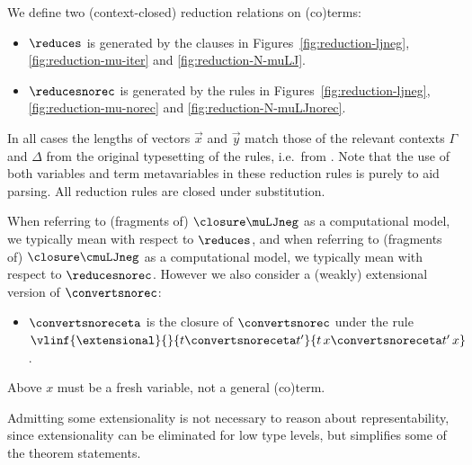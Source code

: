 \begin{definition}
    [Theories]
    We define two (context-closed) reduction relations on (co)terms: 
    \begin{itemize}
        \item $\reduces$ is generated by the clauses in Figures~\ref{fig:reduction-ljneg}, \ref{fig:reduction-mu-iter} and \ref{fig:reduction-N-muLJ}.
        \item $\reducesnorec$ is generated by the rules in Figures~\ref{fig:reduction-ljneg}, \ref{fig:reduction-mu-norec} and \ref{fig:reduction-N-muLJnorec}. 
    \end{itemize}
    In all cases the lengths of vectors $\vec x$ and $\vec y$ match those of the relevant contexts $\Gamma$ and $\Delta$ from the original typesetting of the rules, i.e.\ from .
    Note that the use of both variables and term metavariables in these reduction rules is purely to aid parsing. All reduction rules are closed under substitution.
    
    When referring to (fragments of) $\closure \muLJneg$ as a computational model, we typically mean with respect to $\reduces$, and when referring to (fragments of) $\closure \cmuLJneg$ as a computational model, we typically mean with respect to $\reducesnorec$. {However we also consider a (weakly) extensional version of  $\convertsnorec$:}
    \begin{itemize}
        \item $\convertsnoreceta$ is the closure of $\convertsnorec$ under the rule   $\vlinf{\extensional}{}{ t\convertsnoreceta t'}{t\, x \convertsnoreceta  t'\, x}$.
    \end{itemize}
    Above $x$ must be a fresh variable, not a general (co)term.
\end{definition}

Admitting some extensionality is not necessary to reason about representability, since extensionality can be eliminated for low type levels, but simplifies some of the theorem statements.

